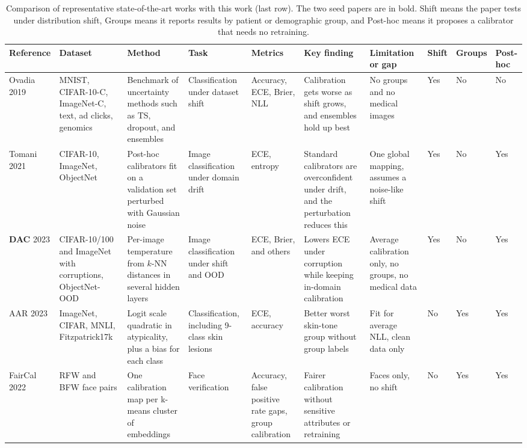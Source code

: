 \documentclass[sigconf,nonacm]{acmart}
\begin{document}
\begin{table}[tp]
  \caption{Comparison of representative state-of-the-art works with this work (last row). The two seed papers are in bold. Shift means the paper tests under distribution shift, Groups means it reports results by patient or demographic group, and Post-hoc means it proposes a calibrator that needs no retraining.}
  \label{tab:literature}
  \scriptsize
  \setlength{\tabcolsep}{3pt}
  \renewcommand{\arraystretch}{1.1}
  \begin{tabularx}{\textwidth}{@{}P{1.7cm}P{2.0cm}LP{1.6cm}P{1.6cm}LP{2.2cm}C{0.75cm}C{0.85cm}C{1.0cm}@{}}
    \toprule
    \textbf{Reference} & \textbf{Dataset} & \textbf{Method} & \textbf{Task} & \textbf{Metrics} & \textbf{Key finding} & \textbf{Limitation or gap} & \textbf{Shift} & \textbf{Groups} & \textbf{Post-hoc} \\
    \midrule
    Ovadia 2019 \cite{ovadia2019trust} & MNIST, CIFAR-10-C, ImageNet-C, text, ad clicks, genomics & Benchmark of uncertainty methods such as TS, dropout, and ensembles & Classification under dataset shift & Accuracy, ECE, Brier, NLL & Calibration gets worse as shift grows, and ensembles hold up best & No groups and no medical images & Yes & No & No \\
    \addlinespace
    Tomani 2021 \cite{tomani2021posthoc} & CIFAR-10, ImageNet, ObjectNet & Post-hoc calibrators fit on a validation set perturbed with Gaussian noise & Image classification under domain drift & ECE, entropy & Standard calibrators are overconfident under drift, and the perturbation reduces this & One global mapping, assumes a noise-like shift & Yes & No & Yes \\
    \addlinespace
    \textbf{DAC} 2023 \cite{tomani2023dac} & CIFAR-10/100 and ImageNet with corruptions, ObjectNet-OOD & Per-image temperature from $k$-NN distances in several hidden layers & Image classification under shift and OOD & ECE, Brier, and others & Lowers ECE under corruption while keeping in-domain calibration & Average calibration only, no groups, no medical data & Yes & No & Yes \\
    \addlinespace
    AAR 2023 \cite{yuksekgonul2023atypicality} & ImageNet, CIFAR, MNLI, Fitzpatrick17k & Logit scale quadratic in atypicality, plus a bias for each class & Classification, including 9-class skin lesions & ECE, accuracy & Better worst skin-tone group without group labels & Fit for average NLL, clean data only & No & Yes & Yes \\
    \addlinespace
    FairCal 2022 \cite{salvador2022faircal} & RFW and BFW face pairs & One calibration map per k-means cluster of embeddings & Face verification & Accuracy, false positive rate gaps, group calibration & Fairer calibration without sensitive attributes or retraining & Faces only, no shift & No & Yes & Yes \\

\end{tabularx}
\end{table}
\end{document}
